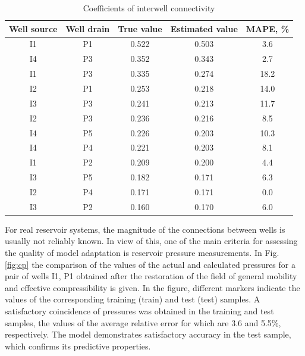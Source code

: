 \documentclass[
11pt,%
tightenlines,%
twoside,%
onecolumn,%
nofloats,%
nobibnotes,%
nofootinbib,%
superscriptaddress,%
noshowpacs,%
centertags]%
{revtex4}
\begin{document}
\begin{table}[h!]
	\caption{Coefficients of interwell connectivity}	
	\label{tabl:connection}	
	\begin{center}
		\begin{tabular}{c|c|c|c|c}
			\hline
			Well source &  Well drain & True value & Estimated  value & MAPE, \% \\
			\hline
			I1 & P1 & 0.522 & 0.503 & 3.6 \\
			I4 & P3 & 0.352 & 0.343 & 2.7 \\
			I1 & P3 & 0.335 & 0.274 & 18.2 \\
			I2 & P1 & 0.253 & 0.218 & 14.0 \\
			I3 & P3 & 0.241 & 0.213 & 11.7 \\
			I2 & P3 & 0.236 & 0.216 & 8.5 \\
			I4 & P5 & 0.226 & 0.203 & 10.3 \\
			I4 & P4 & 0.221 & 0.203 & 8.1 \\
			I1 & P2 & 0.209 & 0.200 & 4.4 \\
			I3 & P5 & 0.182 & 0.171 & 6.3 \\
			I2 & P4 & 0.171 & 0.171 & 0.0 \\
			I3 & P2 & 0.160 & 0.170 & 6.0 \\
			\hline
			
		\end{tabular}
	\end{center}
\end{table}


For real reservoir systems, the magnitude of the connections between wells is usually not reliably known. In view of this, one of the main criteria for assessing the quality of model adaptation is reservoir pressure measurements. In Fig. \ref{fig:cp} the comparison of the values of the actual and calculated pressures for a pair of wells I1, P1 obtained after the restoration of the field of general mobility and effective compressibility is given. In the figure, different markers indicate the values of the corresponding training (train) and test (test) samples. A satisfactory coincidence of pressures was obtained in the training and test samples, the values of the average relative error for which are 3.6 and 5.5\%, respectively. The model demonstrates satisfactory accuracy in the test sample, which confirms its predictive properties.
\end{document}
